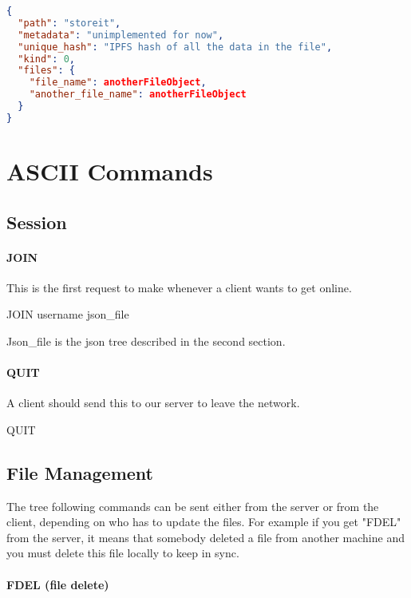\documentclass{article}
\begin{document}
\begin{lstlisting}[language=json,firstnumber=1]
{
  "path": "storeit",
  "metadata": "unimplemented for now",
  "unique_hash": "IPFS hash of all the data in the file",
  "kind": 0,
  "files": {
    "file_name": anotherFileObject,
    "another_file_name": anotherFileObject
  }
}
\end{lstlisting}

\section{ASCII Commands}

\subsection{Session}

\paragraph{JOIN}

This is the first request to make whenever a client wants to get online.\\
\begin{center}JOIN username json\_file\end{center}
Json\_file is the json tree described in the second section.

\paragraph{QUIT}

A client should send this to our server to leave the network.\\

\begin{center}QUIT\end{center}

\subsection{File Management}

The tree following commands can be sent either from the server or from the client, depending on who has to update the files. For example if you get "FDEL" from the server, it means that somebody deleted a file from another machine and you must delete this file locally to keep in sync.
\paragraph{FDEL (file delete)}
\end{document}
